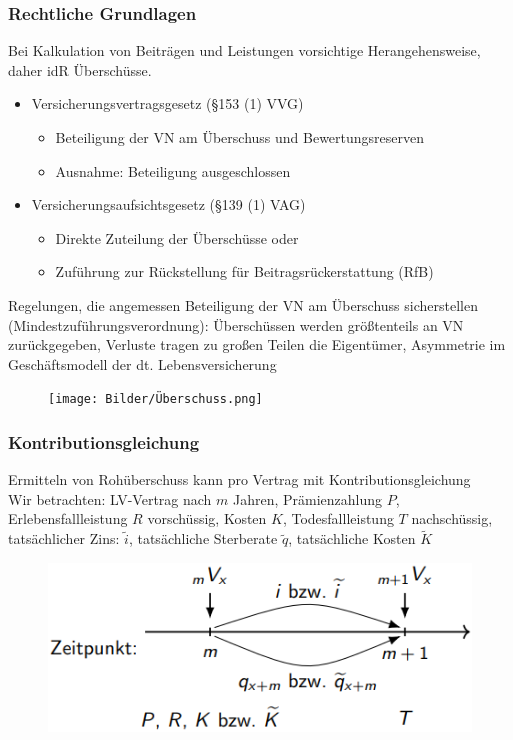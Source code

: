 \documentclass[12pt]{report}
\theoremstyle{dotless}
\theoremstyle{definition}
\begin{document}
\subsubsection{Rechtliche Grundlagen}
Bei Kalkulation von Beiträgen und Leistungen vorsichtige Herangehensweise, daher idR Überschüsse.
\begin{itemize}
\item Versicherungsvertragsgesetz (§153 (1) VVG)
\begin{itemize}
\item Beteiligung der VN am Überschuss und Bewertungsreserven
\item Ausnahme: Beteiligung ausgeschlossen
\end{itemize}
\item Versicherungsaufsichtsgesetz (§139 (1) VAG)
\begin{itemize}
\item Direkte Zuteilung der Überschüsse oder
\item Zuführung zur Rückstellung für Beitragsrückerstattung (RfB)
\end{itemize}
\end{itemize}
Regelungen, die angemessen Beteiligung der VN am Überschuss sicherstellen (Mindestzuführungsverordnung): Überschüssen werden größtenteils an VN zurückgegeben, Verluste tragen zu großen Teilen die Eigentümer, Asymmetrie im Geschäftsmodell der dt. Lebensversicherung

\begin{figure}[ht]
	\centering
	\texttt{[image: Bilder/Überschuss.png]}
\end{figure}

\subsubsection{Kontributionsgleichung}
Ermitteln von Rohüberschuss kann pro Vertrag mit Kontributionsgleichung \\
Wir betrachten: LV-Vertrag nach $m$ Jahren, Prämienzahlung $P$, Erlebensfallleistung $R$ vorschüssig, Kosten $K$, Todesfallleistung $T$ nachschüssig, tatsächlicher Zins: $\widetilde{i}$, tatsächliche Sterberate $\widetilde{q}$, tatsächliche Kosten $\widetilde{K}$


\begin{figure}[ht]
	\centering
	\includegraphics[width = .8\textwidth]{Bilder/Kontributionsgleichung.png}
\end{figure}
\end{document}
